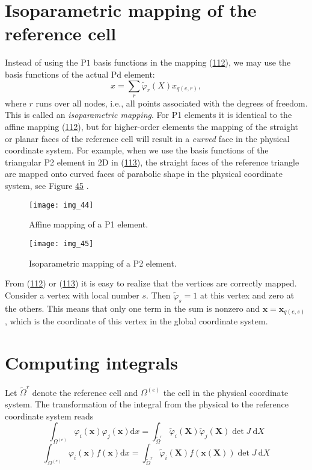 \documentclass[../main.tex]{subfiles}
\begin{document}
\section[Isoparametric mapping of the reference cell]{Isoparametric mapping of the reference cell}
\label{sec:sec_9_4}
Instead of using the $\mathrm{P} 1$ basis functions in the mapping (\hyperref[eqa112]{112}), we may use the basis functions of the actual $\mathrm{Pd}$ element:
\begin{equation}\label{eqa113}
	x=\sum_{r} \tilde{\varphi}_{r}(X) x_{q(e, r)},
\end{equation}
where $r$ runs over all nodes, i.e., all points associated with the degrees of freedom. This is called an \textit{isoparametric mapping}. For P1 elements it is identical to the affine mapping (\hyperref[eqa112]{112}), but for higher-order elements the mapping of the straight or planar faces of the reference cell will result in a \textit{curved} face in the physical coordinate system. For example, when we use the basis functions of the triangular P2 element in $2 \mathrm{D}$ in (\hyperref[eqa113]{113}), the straight faces of the reference triangle are mapped onto curved faces of parabolic shape in the physical coordinate system, see Figure \hyperref[fig:img_45]{45} .
\begin{figure}[H]
	\centering
	\texttt{[image: img\_44]}
	\caption{Affine mapping of a P1 element.}
	\label{fig:img_44}
\end{figure}
\begin{figure}[H]
	\centering
	\texttt{[image: img\_45]}
	\caption{Isoparametric mapping of a P2 element.}
	\label{fig:img_45}
\end{figure}

From (\hyperref[eqa112]{112}) or (\hyperref[eqa113]{113}) it is easy to realize that the vertices are correctly mapped. Consider a vertex with local number $s$. Then $\tilde{\varphi}_{s}=1$ at this vertex and zero at the others. This means that only one term in the sum is nonzero and $\boldsymbol{x}=\boldsymbol{x}_{q(e, s)}$, which is the coordinate of this vertex in the global coordinate system.
\section[Computing integrals]{Computing integrals}
\label{sec:sec_9_5}
Let $\tilde{\Omega}^{r}$ denote the reference cell and $\Omega^{(e)}$ the cell in the physical coordinate system. The transformation of the integral from the physical to the reference coordinate system reads
\begin{equation}\label{eqa114}
	\int_{\Omega^{(e)}} \varphi_{i}(\boldsymbol{x}) \varphi_{j}(\boldsymbol{x}) \mathrm{d} x =\int_{\tilde{\Omega}^{r}} \tilde{\varphi}_{i}(\boldsymbol{X}) \tilde{\varphi}_{j}(\boldsymbol{X}) \operatorname{det} J \mathrm{~d} X
\end{equation}
\begin{equation}\label{eqa115}
	\int_{\Omega^{(e)}} \varphi_{i}(\boldsymbol{x}) f(\boldsymbol{x}) \mathrm{d} x =\int_{\tilde{\Omega}^{r}} \tilde{\varphi}_{i}(\boldsymbol{X}) f(\boldsymbol{x}(\boldsymbol{X})) \operatorname{det} J \mathrm{~d} X
\end{equation}
\end{document}
